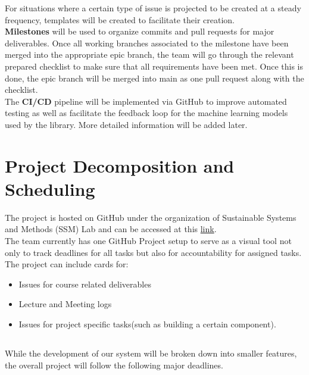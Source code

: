 \documentclass{article}
\begin{document}
\noindent
\hspace{\parindent}For situations where a certain type of issue is projected to be created at a steady frequency, templates will be created to facilitate their creation. \\

\noindent
\hspace{\parindent}\textbf{Milestones} will be used to organize commits and pull requests for major deliverables. Once all working branches associated to the milestone have been merged into the appropriate epic branch, the team will go through the relevant prepared checklist to make sure that all requirements have been met. Once this is done, the epic branch will be merged into main as one pull request along with the checklist. \\

\noindent
\hspace{\parindent}The \textbf{CI/CD} pipeline will be implemented via GitHub to improve automated testing as well as facilitate the feedback loop for the machine learning models used by the library. More detailed information will be added later.

\section{Project Decomposition and Scheduling}

\noindent
\hspace{\parindent}The project is hosted on GitHub under the organization of Sustainable Systems and Methods (SSM) Lab and can be accessed at this \href{https://github.com/orgs/ssm-lab/projects/2}{link}.\\

The team currently has one GitHub Project setup to serve as a visual tool not only to track deadlines for all tasks but also for accountability  for assigned tasks. The project can include cards for:
\begin{itemize}
  \item Issues for course related deliverables
  \item Lecture and Meeting logs
  \item Issues for project specific tasks(such as building a certain component).
\end{itemize}

\subsection*{\color{red}{Schedule}}
While the development of our system will be broken down into smaller features, the overall project will follow the following major deadlines.
\end{document}
